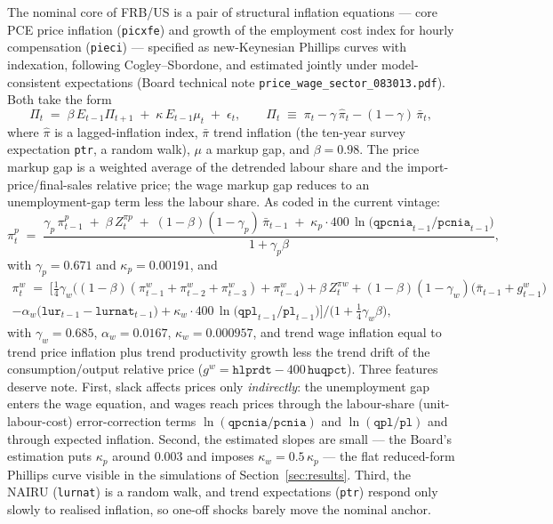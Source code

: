 The nominal core of FRB/US is a pair of structural inflation equations --- core PCE price inflation (\texttt{picxfe}) and growth of the employment cost index for hourly compensation (\texttt{pieci}) --- specified as new-Keynesian Phillips curves with indexation, following Cogley--Sbordone, and estimated jointly under model-consistent expectations (Board technical note \texttt{price\_wage\_sector\_083013.pdf}). Both take the form
\begin{equation}
\Pi_t \;=\; \beta\,E_{t-1}\Pi_{t+1} \;+\; \kappa\,E_{t-1}\mu_t \;+\; \epsilon_t,
\qquad
\Pi_t \;\equiv\; \pi_t - \gamma\,\hat\pi_t - (1-\gamma)\,\bar\pi_t,
\label{eq:nkpc}
\end{equation}
where $\hat\pi$ is a lagged-inflation index, $\bar\pi$ trend inflation (the ten-year survey expectation \texttt{ptr}, a random walk), $\mu$ a markup gap, and $\beta=0.98$. The price markup gap is a weighted average of the detrended labour share and the import-price/final-sales relative price; the wage markup gap reduces to an unemployment-gap term less the labour share. As coded in the current vintage:
\begin{equation}
\pi^{p}_t \;=\; \frac{\gamma_p\,\pi^{p}_{t-1} \;+\; \beta\,Z^{\pi p}_t \;+\; (1-\beta)(1-\gamma_p)\,\bar\pi_{t-1} \;+\; \kappa_p\cdot 400\,\ln\!\big(\texttt{qpcnia}_{t-1}/\texttt{pcnia}_{t-1}\big)}{1+\gamma_p\beta},
\label{eq:picxfe}
\end{equation}
with $\gamma_p=0.671$ and $\kappa_p=0.00191$, and
\begin{multline}
\pi^{w}_t \;=\; \Big[\tfrac{1}{4}\gamma_w\big((1{-}\beta)(\pi^{w}_{t-1}{+}\pi^{w}_{t-2}{+}\pi^{w}_{t-3})+\pi^{w}_{t-4}\big) + \beta\,Z^{\pi w}_t + (1{-}\beta)(1{-}\gamma_w)\big(\bar\pi_{t-1}+g^{w}_{t-1}\big) \\
 - \alpha_w\big(\texttt{lur}_{t-1}-\texttt{lurnat}_{t-1}\big) + \kappa_w\cdot 400\,\ln\!\big(\texttt{qpl}_{t-1}/\texttt{pl}_{t-1}\big)\Big]\Big/\big(1+\tfrac{1}{4}\gamma_w\beta\big),
\label{eq:pieci}
\end{multline}
with $\gamma_w=0.685$, $\alpha_w=0.0167$, $\kappa_w=0.000957$, and trend wage inflation equal to trend price inflation plus trend productivity growth less the trend drift of the consumption/output relative price ($g^w = \texttt{hlprdt}-400\,\texttt{huqpct}$). Three features deserve note. First, slack affects prices only \emph{indirectly}: the unemployment gap enters the wage equation, and wages reach prices through the labour-share (unit-labour-cost) error-correction terms $\ln(\texttt{qpcnia}/\texttt{pcnia})$ and $\ln(\texttt{qpl}/\texttt{pl})$ and through expected inflation. Second, the estimated slopes are small --- the Board's estimation puts $\kappa_p$ around $0.003$ and imposes $\kappa_w=0.5\,\kappa_p$ --- the flat reduced-form Phillips curve visible in the simulations of Section~\ref{sec:results}. Third, the NAIRU (\texttt{lurnat}) is a random walk, and trend expectations (\texttt{ptr}) respond only slowly to realised inflation, so one-off shocks barely move the nominal anchor.

